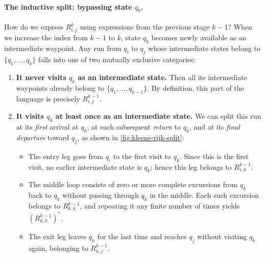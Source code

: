 \paragraph{The inductive split: bypassing state $q_k$.}
How do we express $R_{i,j}^k$ using expressions from the previous stage $k-1$?
When we increase the index from $k-1$ to $k$, state $q_k$ becomes newly available as an intermediate waypoint. Any run from $q_i$ to $q_j$ whose intermediate states belong to $\{q_1, \ldots, q_k\}$ falls into one of two mutually exclusive categories:
\begin{enumerate}[leftmargin=1.2em, nosep]
  \item \textbf{It never visits $q_k$ as an intermediate state.} Then all its intermediate waypoints already belong to $\{q_1, \ldots, q_{k-1}\}$. By definition, this part of the language is precisely $R_{i,j}^{k-1}$.
  \item \textbf{It visits $q_k$ at least once as an intermediate state.} We can split this run at its \emph{first} arrival at $q_k$, at each subsequent \emph{return} to $q_k$, and at its \emph{final departure} toward $q_j$, as shown in \cref{fig:kleene-rijk-split}:
  \begin{itemize}[nosep]
    \item The entry leg goes from $q_i$ to the first visit to $q_k$. Since this is the first visit, no earlier intermediate state is $q_k$; hence this leg belongs to $R_{i,k}^{k-1}$.
    \item The middle loop consists of zero or more complete excursions from $q_k$ back to $q_k$ without passing through $q_k$ in the middle. Each such excursion belongs to $R_{k,k}^{k-1}$, and repeating it any finite number of times yields $(R_{k,k}^{k-1})^*$.
    \item The exit leg leaves $q_k$ for the last time and reaches $q_j$ without visiting $q_k$ again, belonging to $R_{k,j}^{k-1}$.
  \end{itemize}
\end{enumerate}

